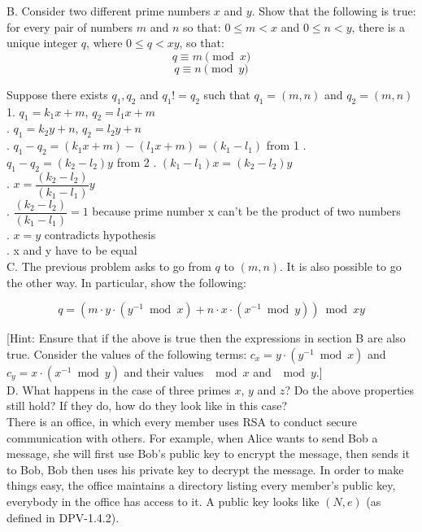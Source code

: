 \documentclass{article}
\begin{document}
\noindent B. Consider two different prime numbers $x$ and $y$. Show that the
following is true: for every pair of numbers $m$ and $n$ so that: $0
\leq m < x$ and $0 \leq n < y$, there is a unique integer $q$, where
$0 \leq q < xy$, so that:
$$q \equiv m \pmod{x}$$
$$q \equiv n \pmod{y}$$

Suppose there exists $q_1, q_2$ and $q_1 != q_2$ such that $q_1 = (m, n)$ and $q_2 = (m, n)$\\

1. $q_1 = k_1x+m$, $q_2 = l_1x+m$\\
. $q_1 = k_2y+n$, $q_2 = l_2y+n$\\
. $q_1 - q_2 = (k_1x + m) - (l_1x + m) = (k_1 - l_1)$ from 1
. $q_1 - q_2 = (k_2 - l_2) y$ from 2
. $(k_1 - l_1)x = (k_2 - l_2)y$\\
. $x=\dfrac{(k_2 - l_2)}{(k_1 - l_1)}y$\\
. $\dfrac{(k_2 - l_2)}{(k_1 - l_1)} = 1$ because prime number x can't be the product of two numbers\\
. $x = y$ contradicts hypothesis\\
. x and y have to be equal\\
  
\noindent C. The previous problem asks to go from $q$ to $(m,n)$. It is also
possible to go the other way. In particular, show the following:

$$q = ( m \cdot y \cdot (y^{-1} \bmod{x}) + n \cdot x \cdot
(x^{-1} \bmod{y}) ) \bmod{xy}$$

[Hint: Ensure that if the above is true then the expressions in section B are
  also true. Consider the values of the following terms: $c_x = y
  \cdot (y^{-1} \bmod{x})$ and $c_y = x \cdot (x^{-1} \bmod{y})$ and
their values $\mod{x}$ and $\mod{y}$.]\\

\noindent D. What happens in the case of three primes $x$, $y$ and $z$? Do the
above properties still hold? If they do, how do they look like in this
case?\\



 There is an office, in which every member
uses RSA to conduct secure communication with others.  For example,
when Alice wants to send Bob a message, she will first use Bob's
public key to encrypt the message, then sends it to Bob, Bob then uses
his private key to decrypt the message.  In order to make things easy,
the office maintains a directory listing every member's public key,
everybody in the office has access to it. A public key looks like $(N,
e)$ (as defined in DPV-1.4.2).
\end{document}
